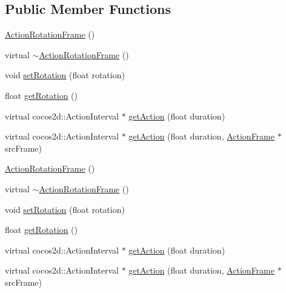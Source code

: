 \subsection*{Public Member Functions}
\begin{DoxyCompactItemize}
\item 
\hyperlink{classcocostudio_1_1ActionRotationFrame_a233bfdd9efc12d3ff60b858b0051af71}{Action\+Rotation\+Frame} ()
\item 
virtual \hyperlink{classcocostudio_1_1ActionRotationFrame_a263e568b035f64c3febd5aee836138e3}{$\sim$\+Action\+Rotation\+Frame} ()
\item 
void \hyperlink{classcocostudio_1_1ActionRotationFrame_adc0bf018e56a6cb589164b3db1cf6da0}{set\+Rotation} (float rotation)
\item 
float \hyperlink{classcocostudio_1_1ActionRotationFrame_a49d1b55234d8e12bf8d2b976ba6a299f}{get\+Rotation} ()
\item 
virtual cocos2d\+::\+Action\+Interval $\ast$ \hyperlink{classcocostudio_1_1ActionRotationFrame_af44596d9558e7b904a77b1ca504e74b5}{get\+Action} (float duration)
\item 
virtual cocos2d\+::\+Action\+Interval $\ast$ \hyperlink{classcocostudio_1_1ActionRotationFrame_adb56d8ed3cc97f590cba9429602ef918}{get\+Action} (float duration, \hyperlink{classcocostudio_1_1ActionFrame}{Action\+Frame} $\ast$src\+Frame)
\item 
\hyperlink{classcocostudio_1_1ActionRotationFrame_a233bfdd9efc12d3ff60b858b0051af71}{Action\+Rotation\+Frame} ()
\item 
virtual \hyperlink{classcocostudio_1_1ActionRotationFrame_a5c497801138129c3b30d1ad1f492e019}{$\sim$\+Action\+Rotation\+Frame} ()
\item 
void \hyperlink{classcocostudio_1_1ActionRotationFrame_adc0bf018e56a6cb589164b3db1cf6da0}{set\+Rotation} (float rotation)
\item 
float \hyperlink{classcocostudio_1_1ActionRotationFrame_a49d1b55234d8e12bf8d2b976ba6a299f}{get\+Rotation} ()
\item 
virtual cocos2d\+::\+Action\+Interval $\ast$ \hyperlink{classcocostudio_1_1ActionRotationFrame_a6ca8b34044106cf7e71dc9fe301d5b5a}{get\+Action} (float duration)
\item 
virtual cocos2d\+::\+Action\+Interval $\ast$ \hyperlink{classcocostudio_1_1ActionRotationFrame_ab713e9ea4332bb5cea201b7f6dc424fc}{get\+Action} (float duration, \hyperlink{classcocostudio_1_1ActionFrame}{Action\+Frame} $\ast$src\+Frame)
\end{DoxyCompactItemize}
